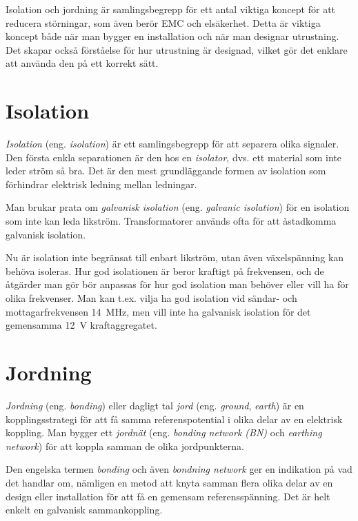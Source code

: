 
Isolation och jordning är samlingsbegrepp för ett antal viktiga koncept för
att reducera störningar, som även berör EMC och elsäkerhet.
Detta är viktiga koncept både när man bygger en installation och när man
designar utrustning.
Det skapar också förståelse för hur utrustning är designad, vilket gör det
enklare att använda den på ett korrekt sätt.

\section{Isolation}

\emph{Isolation} (eng. \emph{isolation}) är ett samlingsbegrepp för att separera
olika signaler.
Den första enkla separationen är den hos en \emph{isolator}, dvs. ett material
som inte leder ström så bra. Det är den mest grundläggande formen av isolation
som förhindrar elektrisk ledning mellan ledningar.

Man brukar prata om \emph{galvanisk isolation} (eng. \emph{galvanic isolation})
för en isolation som inte kan leda likström.
Transformatorer används ofta för att åstadkomma galvanisk isolation.

Nu är isolation inte begränsat till enbart likström, utan även växelspänning
kan behöva isoleras. Hur god isolationen är beror kraftigt på frekvensen, och
de åtgärder man gör bör anpassas för hur god isolation man behöver eller vill
ha för olika frekvenser.
Man kan t.ex. vilja ha god isolation vid sändar- och mottagarfrekvensen 14~MHz,
men vill inte ha galvanisk isolation för det gemensamma 12~V kraftaggregatet.

\section{Jordning}

\emph{Jordning} (eng. \emph{bonding}) eller dagligt tal \emph{jord} (eng.
\emph{ground}, \emph{earth}) är en kopplingsstrategi för att få samma
referenspotential i olika delar av en elektrisk koppling.
Man bygger ett \emph{jordnät} (eng. \emph{bonding network (BN)}
\cite[3.2.1]{K27-1991} och \emph{earthing network}) \cite[3.1.3]{K27-1991}
för att koppla samman de olika jordpunkterna.

Den engelska termen \emph{bonding} och även \emph{bondning network} ger en
indikation på vad det handlar om, nämligen en metod att knyta samman flera
olika delar av en design eller installation för att få en gemensam
referensspänning.
Det är helt enkelt en galvanisk sammankoppling.

